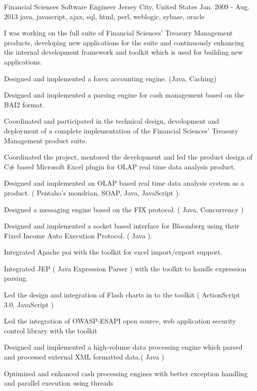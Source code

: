 \cventry
    {Financial Sciences} %
    {Software Engineer} %
    {Jersey City, United States} %
    {Jan. 2009 - Aug. 2013} %
    { java, javascript, ajax, sql, html, perl, weblogic, sybase, oracle } %
    {
        I was working on the full suite of Financial Sciences' Treasury Management products, developing new applications for the suite and continuously enhancing the
        internal development framework and toolkit which is used for building new applications.
    \begin{cvitems} %
        \item { Designed and implemented a forex accounting engine. (Java, Caching)}
        \item { Designed and implemented a parsing engine for cash management based on the BAI2 format.}
        \item { Coordinated and participated in the technical design, development and deployment of a complete implementation of the Financial Sciences' Treasury Management product suite.}
        \item { Coordinated the project, mentored the development and led the product design of C\# based Microsoft Excel plugin for OLAP real time data analysis product.}
        \item { Designed and implemented an OLAP based real time data analysis system as a product. ( Pentaho's mondrian, SOAP, Java, JavaScript ).}
        \item { Designed a messaging engine based on the FIX protocol. ( Java, Concurrency )}
        \item { Designed and implemented a socket based interface for Bloomberg using their Fixed Income Auto Execution Protocol. ( Java ).}
        \item { Integrated Apache poi with the toolkit for excel import/export support.}
        \item { Integrated JEP ( Java Expression Parser ) with the toolkit to handle expression parsing.}
        \item { Led the design and integration of Flash charts in to the toolkit ( ActionScript 3.0, JavaScript )}
        \item { Led the integration of OWASP-ESAPI open source, web application security control library with the toolkit}
        \item { Designed and implemented a high-volume data processing engine which parsed and processed external XML formatted data.( Java )}
        \item { Optimized and enhanced cash processing engines with better exception handling and parallel execution using threads }
    \end{cvitems}
    }